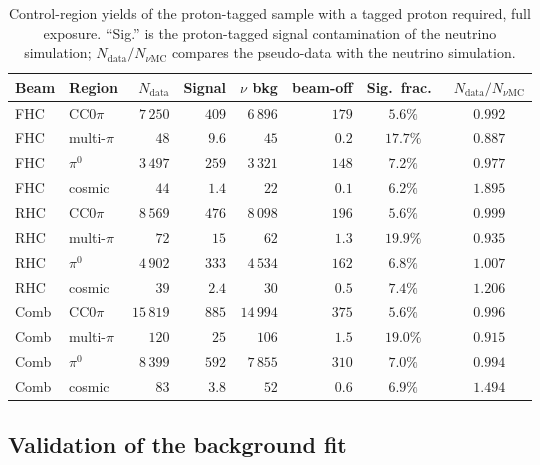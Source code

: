 \documentclass[11pt,a4paper]{article}
\begin{document}
\begin{table}[H]
  \centering
  \caption{Control-region yields of the proton-tagged sample with a tagged proton required, full exposure.
    ``Sig.'' is the proton-tagged signal contamination of the neutrino simulation;
    $N_\mathrm{data}/N_{\nu\mathrm{MC}}$ compares the pseudo-data with the neutrino simulation.}
  \label{tab:sidebands_1p}
  \small
  \begin{tabular}{llrrrrcc}
    \toprule
    Beam & Region & $N_\mathrm{data}$ & Signal & $\nu$ bkg & beam-off & Sig.\ frac.\ & $N_\mathrm{data}/N_{\nu\mathrm{MC}}$ \\
    \midrule
    FHC & CC$0\pi$ & $7\,250$ & $409$ & $6\,896$ & $179$ & $5.6\%$ & $0.992$ \\
    FHC & multi-$\pi$ & $48$ & $9.6$ & $45$ & $0.2$ & $17.7\%$ & $0.887$ \\
    FHC & $\pi^0$ & $3\,497$ & $259$ & $3\,321$ & $148$ & $7.2\%$ & $0.977$ \\
    FHC & cosmic & $44$ & $1.4$ & $22$ & $0.1$ & $6.2\%$ & $1.895$ \\
    RHC & CC$0\pi$ & $8\,569$ & $476$ & $8\,098$ & $196$ & $5.6\%$ & $0.999$ \\
    RHC & multi-$\pi$ & $72$ & $15$ & $62$ & $1.3$ & $19.9\%$ & $0.935$ \\
    RHC & $\pi^0$ & $4\,902$ & $333$ & $4\,534$ & $162$ & $6.8\%$ & $1.007$ \\
    RHC & cosmic & $39$ & $2.4$ & $30$ & $0.5$ & $7.4\%$ & $1.206$ \\
    Comb & CC$0\pi$ & $15\,819$ & $885$ & $14\,994$ & $375$ & $5.6\%$ & $0.996$ \\
    Comb & multi-$\pi$ & $120$ & $25$ & $106$ & $1.5$ & $19.0\%$ & $0.915$ \\
    Comb & $\pi^0$ & $8\,399$ & $592$ & $7\,855$ & $310$ & $7.0\%$ & $0.994$ \\
    Comb & cosmic & $83$ & $3.8$ & $52$ & $0.6$ & $6.9\%$ & $1.494$ \\
    \bottomrule
  \end{tabular}
\end{table}

\subsection{Validation of the background fit}
\label{sec:bkgfit_validation}
\end{document}
